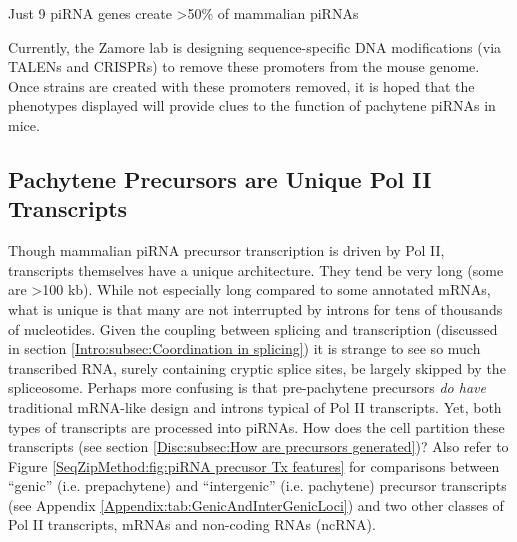     \begin{table} %
      \caption{Just 9 piRNA genes create >50\% of mammalian piRNAs}
      \label{SeqZipMethod:tab:matchedClusterValues}
      \end{table}
    

    Currently, the Zamore lab is designing sequence-specific DNA modifications (via TALENs and CRISPRs) to remove these promoters from the mouse genome. Once strains are created with these promoters removed, it is hoped that the phenotypes displayed will provide clues to the function of pachytene piRNAs in mice.

  \subsection{Pachytene Precursors are Unique Pol II Transcripts}
    \label{SeqZipMethod:subsec:pachytene Tx are different}

    Though mammalian piRNA precursor transcription is driven by Pol II, transcripts themselves have a unique architecture. They tend be very long (some are >100 kb). While not especially long compared to some annotated mRNAs, what is unique is that many are not interrupted by introns for tens of thousands of nucleotides. Given the coupling between splicing and transcription (discussed in section \ref{Intro:subsec:Coordination in splicing}) it is strange to see so much transcribed RNA, surely containing cryptic splice sites, be largely skipped by the spliceosome. Perhaps more confusing is that pre-pachytene precursors \textit{do have} traditional mRNA-like design and introns typical of Pol II transcripts. Yet, both types of transcripts are processed into piRNAs. How does the cell partition these transcripts (see section \ref{Disc:subsec:How are precursors generated})? Also refer to Figure \ref{SeqZipMethod:fig:piRNA precusor Tx features} for comparisons between ``genic'' (i.e. prepachytene) and ``intergenic'' (i.e. pachytene) precursor transcripts (see Appendix \ref{Appendix:tab:GenicAndInterGenicLoci}) and two other classes of Pol II transcripts, mRNAs and non-coding RNAs (ncRNA).

